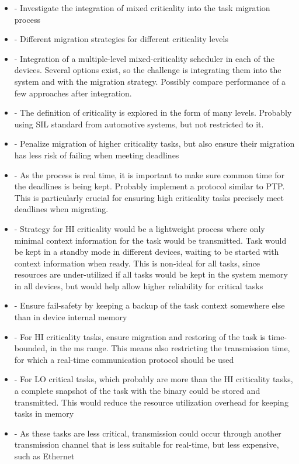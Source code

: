 \begin{itemize}
\item - Investigate the integration of mixed criticality into the task migration process
\item - Different migration strategies for different criticality levels
\item - Integration of a multiple-level mixed-criticality scheduler in each of the devices. Several options exist, so the challenge is integrating them into the system and with the migration strategy. Possibly compare performance of a few approaches after integration.
\item - The definition of criticality is explored in the form of many levels. Probably using SIL standard from automotive systems, but not restricted to it.
\item - Penalize migration of higher criticality tasks, but also ensure their migration has less risk of failing when meeting deadlines
\item - As the process is real time, it is important to make sure common time for the deadlines is being kept. Probably implement a protocol similar to PTP. This is particularly crucial for ensuring high criticality tasks precisely meet deadlines when migrating.
\item - Strategy for HI criticality would be a lightweight process where only minimal context information for the task would be transmitted. Task would be kept in a standby mode in different devices, waiting to be started with context information when ready. This is non-ideal for all tasks, since resources are under-utilized if all tasks would be kept in the system memory in all devices, but would help allow higher reliability for critical tasks
\item - Ensure fail-safety by keeping a backup of the task context somewhere else than in device internal memory
\item - For HI criticality tasks, ensure migration and restoring of the task is time-bounded, in the ms range. This means also restricting the transmission time, for which a real-time communication protocol should be used
\item - For LO critical tasks, which probably are more than the HI criticality tasks, a complete snapshot of the task with the binary could be stored and transmitted. This would reduce the resource utilization overhead for keeping tasks in memory
\item - As these tasks are less critical, transmission could occur through another transmission channel that is less suitable for real-time, but less expensive, such as Ethernet

\end{itemize}
